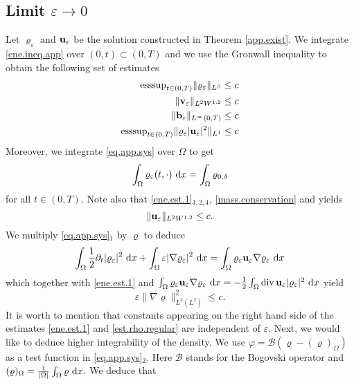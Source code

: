 \documentclass{article}
\DeclareMathOperator{\diver}{div}
\newcommand{\bb}{{\bf b}}
\newcommand{\bu}{{\bf u}}
\newcommand{\vu}{\bu}
\newcommand{\bv}{{\bf v}}
\newcommand{\vv}{\bv}
\newcommand{\pat}{\partial_t}
\numberwithin{equation}{section}
\begin{document}
\subsection{Limit $\varepsilon\to 0$}
Let $\varrho_\varepsilon$ and $\vu_\varepsilon$ be the solution constructed in Theorem \ref{app.exist}. We integrate \eqref{ene.ineq.app} over $(0,t)\subset (0,T)$ and we use the Gronwall inequality to obtain the following set of estimates
\begin{equation}
\begin{split} \label{ene.est.1}
{\rm esssup}_{t\in (0,T)}\|\varrho_\varepsilon\|_{L^\beta} &\leq c\\
\|\vv_\varepsilon\|_{L^2W^{1,2}} & \leq c\\
\|\bb_\varepsilon\|_{L^\infty(0,T)} & \leq c\\
{\rm esssup}_{t\in (0,T)}\|\varrho_\varepsilon|\vu_\varepsilon|^2\|_{L^1} & \leq c
\end{split}
\end{equation}
Moreover, we integrate \eqref{eq.app.sys} over $\Omega$ to get
\begin{equation}\label{mass.conservation}
\int_\Omega\varrho_\varepsilon(t,\cdot)\ {\rm d}x = \int_\Omega \varrho_{0,\delta}
\end{equation}
for all $t\in (0,T)$. Note also that \eqref{ene.est.1}$_{1,2,4}$, \eqref{mass.conservation} and \cite[Lemma 3.2]{feireisl} yields
$$
\|\vu_\varepsilon\|_{L^2W^{1,2}}\leq c.
$$
We multiply \eqref{eq.app.sys}$_1$ by $\varrho$ to deduce
$$\int_{\Omega} \frac 12 \pat |\varrho_\varepsilon|^2\ {\rm d}x + \int_\Omega\varepsilon |\nabla \varrho_\varepsilon|^2\ {\rm d}x = \int_\Omega \varrho_\varepsilon\vu_\varepsilon \nabla\varrho_\varepsilon\ {\rm d}x
$$
which together with \eqref{ene.est.1} and $\int_\Omega\varrho_\varepsilon\vu_\varepsilon\nabla\varrho_\varepsilon\ {\rm d}x = -\frac 12\int_\Omega \diver \vu_\varepsilon |\varrho_\varepsilon|^2\ {\rm d}x$ yield
\begin{equation}\label{est.rho.regular}
\varepsilon\|\nabla\varrho\|_{L^2(L^2)}^2 \leq c.
\end{equation}
It is worth to mention that constants appearing on the right hand side of the estimates \eqref{ene.est.1} and \eqref{est.rho.regular} are independent of $\varepsilon$. Next, we would like to deduce higher integrability of the density. We use $\varphi = \mathcal B(\varrho - (\varrho)_\Omega)$ as a test function in \eqref{eq.app.sys}$_2$. Here $\mathcal B$ stands for the Bogovski operator and $(\varrho)_\Omega = \frac 1{|\Omega|} \int_\Omega\varrho \ {\rm d}x$. We deduce that
\end{document}
